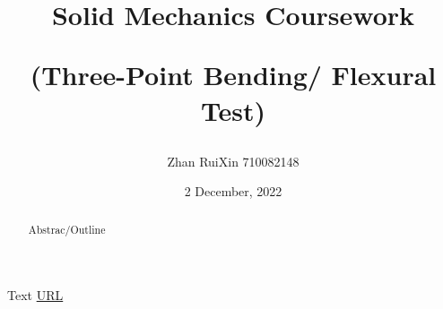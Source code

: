 \documentclass[11pt]{article}
\title{
 Solid Mechanics Coursework 
 
  (Three-Point Bending/ Flexural Test)
    }
\author{
Zhan RuiXin 710082148
}
\date{
   2 December, 2022
}
\begin{document}
\maketitle
\renewcommand{\abstractname}{\large Abstract}

\begin{abstract}
	\large
Abstrac/Outline
\end{abstract}
{} %

 




\newpage
\begin{thebibliography}{99}
 Text
 \url{URL}
\end{thebibliography}
%
%
%
\newpage

\end{document}
